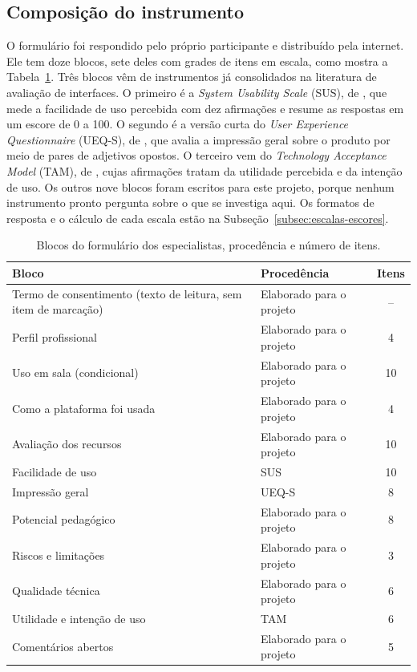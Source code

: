 \subsection{Composição do instrumento}

O formulário foi respondido pelo próprio participante e distribuído pela internet. Ele tem doze blocos, sete deles com grades de itens em escala, como mostra a Tabela~\ref{tab:blocos-pa01}. Três blocos vêm de instrumentos já consolidados na literatura de avaliação de interfaces. O primeiro é a \textit{System Usability Scale} (SUS), de , que mede a facilidade de uso percebida com dez afirmações e resume as respostas em um escore de 0 a 100. O segundo é a versão curta do \textit{User Experience Questionnaire} (UEQ-S), de , que avalia a impressão geral sobre o produto por meio de pares de adjetivos opostos. O terceiro vem do \textit{Technology Acceptance Model} (TAM), de , cujas afirmações tratam da utilidade percebida e da intenção de uso. Os outros nove blocos foram escritos para este projeto, porque nenhum instrumento pronto pergunta sobre o que se investiga aqui. Os formatos de resposta e o cálculo de cada escala estão na Subseção~\ref{subsec:escalas-escores}.

\begin{table}[htbp]
\centering
\caption{Blocos do formulário dos especialistas, procedência e número de itens.}
\label{tab:blocos-pa01}
\footnotesize
\renewcommand{\arraystretch}{1.2}
\begin{tabular}{|p{5.2cm}|p{4.6cm}|c|}
\hline
\textbf{Bloco} & \textbf{Procedência} & \textbf{Itens} \\\hline
Termo de consentimento (texto de leitura, sem item de marcação) & Elaborado para o projeto & -- \\\hline
Perfil profissional & Elaborado para o projeto & 4 \\\hline
Uso em sala (condicional) & Elaborado para o projeto & 10 \\\hline
Como a plataforma foi usada & Elaborado para o projeto & 4 \\\hline
Avaliação dos recursos & Elaborado para o projeto & 10 \\\hline
Facilidade de uso & SUS \cite{brooke1996} & 10 \\\hline
Impressão geral & UEQ-S \cite{schrepp2017} & 8 \\\hline
Potencial pedagógico & Elaborado para o projeto & 8 \\\hline
Riscos e limitações & Elaborado para o projeto & 3 \\\hline
Qualidade técnica & Elaborado para o projeto & 6 \\\hline
Utilidade e intenção de uso & TAM \cite{davis1989} & 6 \\\hline
Comentários abertos & Elaborado para o projeto & 5 \\\hline
\end{tabular}
\end{table}

